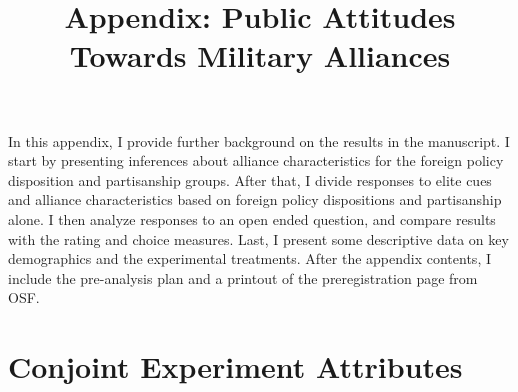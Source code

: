 \documentclass[12pt]{article}
\title{\textbf{Appendix: Public Attitudes Towards Military Alliances}}
\author{}
\date{}
\begin{document}
\maketitle 

\doublespace 


In this appendix, I provide further background on the results in the manuscript. 
I start by presenting inferences about alliance characteristics for the foreign policy disposition and partisanship groups. 
After that, I divide responses to elite cues and alliance characteristics based on foreign policy dispositions and partisanship alone. 
I then analyze responses to an open ended question, and compare results with the rating and choice measures.
Last, I present some descriptive data on key demographics and the experimental treatments. 
After the appendix contents, I include the pre-analysis plan and a printout of the preregistration page from OSF.


\tableofcontents


\newpage



\section{Conjoint Experiment Attributes}
\end{document}
